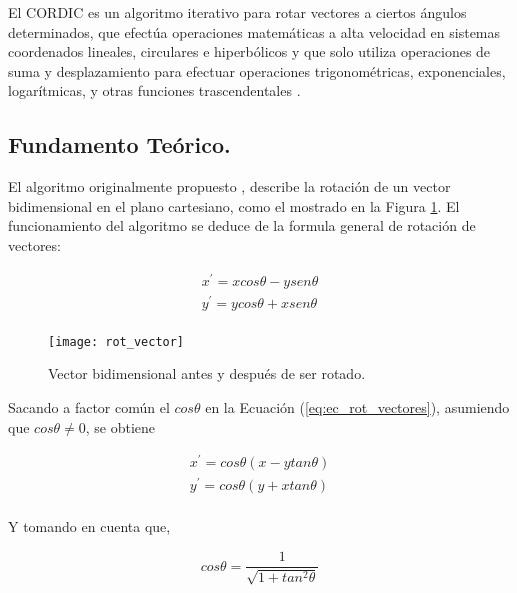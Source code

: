 El CORDIC es un algoritmo iterativo para rotar vectores a ciertos ángulos determinados, que efectúa operaciones matemáticas a alta velocidad en sistemas coordenados lineales, circulares e hiperbólicos y que solo utiliza operaciones de suma y desplazamiento para efectuar operaciones trigonométricas, exponenciales, logarítmicas, y otras funciones trascendentales \cite{DoubleCordic}.


\subsection{Fundamento Teórico.}

El algoritmo originalmente propuesto \cite{CORDIC}, describe la rotación de un vector bidimensional en el plano cartesiano, como el mostrado en la Figura \ref{fig:rot_vector}. El funcionamiento del algoritmo se deduce de la formula general de rotación de vectores:

\begin{equation}\label{eq:ec_rot_vectores}
\begin{array}{l}
     x^{\prime} = xcos \theta - ysen \theta \\
     y^{\prime} = ycos \theta + xsen \theta \\
\end{array}
\end{equation}

\begin{figure}[htb]
  \centering
  \texttt{[image: rot\_vector]}
  \caption{Vector bidimensional antes y después de ser rotado.}
  \label{fig:rot_vector}
\end{figure}

Sacando a factor común el $cos\theta$ en la Ecuación (\ref{eq:ec_rot_vectores}), asumiendo que $cos\theta \neq 0$, se obtiene

\begin{equation}\label{eq:ec_rot_vectores2}
\begin{array}{l}
     x^{\prime} = cos \theta(x - ytan \theta )\\
     y^{\prime} = cos \theta(y + xtan \theta )\\
\end{array}
\end{equation}

Y tomando en cuenta que,

\begin{equation}\label{eq:cos_cita}
 cos\theta = \dfrac{1}{\sqrt{1 + tan^{2}\theta}}
\end{equation}

